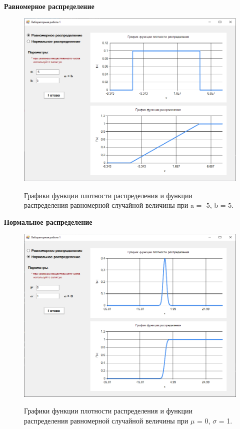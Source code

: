 \textbf{Равномерное распределение}
\begin{figure}[h]
	\begin{center}
		{\includegraphics[scale = 0.65]{img/eval.png}}
		\caption{Графики функции плотности распределения и функции распределения равномерной случайной величины при a = -5, b = 5.}
		\label{fig1:image}
	\end{center}
\end{figure}

\newpage

\textbf{Нормальное распределение}
\begin{figure}[h]
	\begin{center}
		{\includegraphics[scale = 0.65]{img/norm.png}}
		\caption{Графики функции плотности распределения и функции распределения равномерной случайной величины при $\mu$ = 0, $\sigma$ = 1.}
		\label{fig2:image}
	\end{center}
\end{figure}